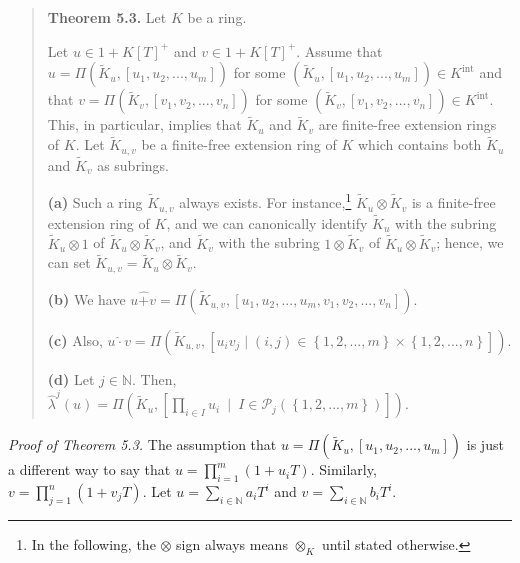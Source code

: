 \documentclass[numbers=enddot,12pt,final,onecolumn,notitlepage]{scrartcl}%
\begin{document}
\begin{quote}
\textbf{Theorem 5.3.} Let $K$ be a ring.

Let $u\in1+K\left[  T\right]  ^{+}$ and $v\in1+K\left[  T\right]  ^{+}$.
Assume that $u=\Pi\left(  \widetilde{K}_{u},\left[  u_{1},u_{2},...,u_{m}%
\right]  \right)  $ for some $\left(  \widetilde{K}_{u},\left[  u_{1}%
,u_{2},...,u_{m}\right]  \right)  \in K^{\operatorname*{int}}$ and that
$v=\Pi\left(  \widetilde{K}_{v},\left[  v_{1},v_{2},...,v_{n}\right]  \right)
$ for some $\left(  \widetilde{K}_{v},\left[  v_{1},v_{2},...,v_{n}\right]
\right)  \in K^{\operatorname*{int}}$. This, in particular, implies that
$\widetilde{K}_{u}$ and $\widetilde{K}_{v}$ are finite-free extension rings of
$K$. Let $\widetilde{K}_{u,v}$ be a finite-free extension ring of $K$ which
contains both $\widetilde{K}_{u}$ and $\widetilde{K}_{v}$ as subrings.

\textbf{(a)} Such a ring $\widetilde{K}_{u,v}$ always exists. For
instance,\footnote{In the following, the $\otimes$ sign always means
$\otimes_{K}$ until stated otherwise.} $\widetilde{K}_{u}\otimes
\widetilde{K}_{v}$ is a finite-free extension ring of $K$, and we can
canonically identify $\widetilde{K}_{u}$ with the subring $\widetilde{K}%
_{u}\otimes1$ of $\widetilde{K}_{u}\otimes\widetilde{K}_{v}$, and
$\widetilde{K}_{v}$ with the subring $1\otimes\widetilde{K}_{v}$ of
$\widetilde{K}_{u}\otimes\widetilde{K}_{v}$; hence, we can set $\widetilde{K}%
_{u,v}=\widetilde{K}_{u}\otimes\widetilde{K}_{v}$.

\textbf{(b)} We have $u\widehat{+}v=\Pi\left(  \widetilde{K}_{u,v},\left[
u_{1},u_{2},...,u_{m},v_{1},v_{2},...,v_{n}\right]  \right)  $.

\textbf{(c)} Also, $u\widehat{\cdot}v=\Pi\left(  \widetilde{K}_{u,v},\left[
u_{i}v_{j}\mid\left(  i,j\right)  \in\left\{  1,2,...,m\right\}
\times\left\{  1,2,...,n\right\}  \right]  \right)  $.

\textbf{(d)} Let $j\in\mathbb{N}$. Then, $\widehat{\lambda}^{j}\left(
u\right)  =\Pi\left(  \widetilde{K}_{u},\left[  \prod\limits_{i\in I}%
u_{i}\ \mid\ I\in\mathcal{P}_{j}\left(  \left\{  1,2,...,m\right\}  \right)
\right]  \right)  $.
\end{quote}

\textit{Proof of Theorem 5.3.} The assumption that $u=\Pi\left(
\widetilde{K}_{u},\left[  u_{1},u_{2},...,u_{m}\right]  \right)  $ is just a
different way to say that $u=\prod\limits_{i=1}^{m}\left(  1+u_{i}T\right)  $.
Similarly, $v=\prod\limits_{j=1}^{n}\left(  1+v_{j}T\right)  $. Let
$u=\sum\limits_{i\in\mathbb{N}}a_{i}T^{i}$ and $v=\sum\limits_{i\in\mathbb{N}%
}b_{i}T^{i}$.
\end{document}
